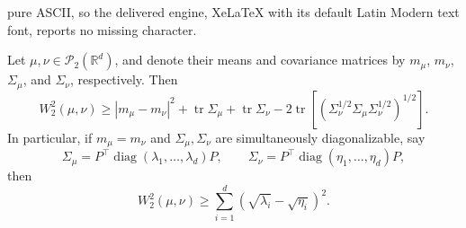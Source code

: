 \documentclass[10pt,a4paper]{amsart}
\begin{document}
pure ASCII, so the delivered engine, XeLaTeX with its default Latin Modern text font, reports no missing character.
\begin{lemma}\label{lem:Gelbrich-lower-bound}
Let $\mu,\nu\in\mathcal P_2(\mathbb R^d)$, and denote their means and
covariance matrices by $m_\mu$, $m_\nu$, $\Sigma_\mu$, and $\Sigma_\nu$, respectively. Then
\[
W_2^2(\mu,\nu)
\geq |m_\mu-m_\nu|^2
+
\operatorname{tr}\Sigma_\mu
+
\operatorname{tr}\Sigma_\nu 
-
2\operatorname{tr}
\left[
\left(
\Sigma_\nu^{1/2}\Sigma_\mu\Sigma_\nu^{1/2}
\right)^{1/2}
\right].
\]
In particular, if $m_\mu=m_\nu$ and $\Sigma_\mu,\Sigma_\nu$ are simultaneously
diagonalizable, say
\[
\Sigma_\mu=P^\top\operatorname{diag}(\lambda_1,\dots,\lambda_d)P,
\qquad
\Sigma_\nu=P^\top\operatorname{diag}(\eta_1,\dots,\eta_d)P,
\]
then
\[
W_2^2(\mu,\nu)
\ge
\sum_{i=1}^d
\left(\sqrt{\lambda_i}-\sqrt{\eta_i}\right)^2.
\]
\end{lemma}
\end{document}
